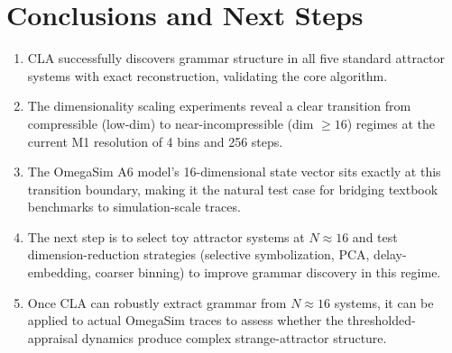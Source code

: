 \documentclass[11pt]{article}
\begin{document}
\section{Conclusions and Next Steps}

\begin{enumerate}
    \item CLA successfully discovers grammar structure in all five standard attractor systems with exact reconstruction, validating the core algorithm.
    \item The dimensionality scaling experiments reveal a clear transition from compressible (low-dim) to near-incompressible (dim $\geq 16$) regimes at the current M1 resolution of 4 bins and 256 steps.
    \item The OmegaSim A6 model's 16-dimensional state vector sits exactly at this transition boundary, making it the natural test case for bridging textbook benchmarks to simulation-scale traces.
    \item The next step is to select toy attractor systems at $N \approx 16$ and test dimension-reduction strategies (selective symbolization, PCA, delay-embedding, coarser binning) to improve grammar discovery in this regime.
    \item Once CLA can robustly extract grammar from $N \approx 16$ systems, it can be applied to actual OmegaSim traces to assess whether the thresholded-appraisal dynamics produce complex strange-attractor structure.
\end{enumerate}
\end{document}
